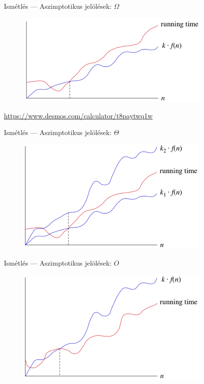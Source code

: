 \documentclass{beamer}
\begin{document}
\begin{frame}{Ismétlés --- Aszimptotikus jelölések: $\Omega$}
\begin{figure}
	\centering
	\includegraphics{Omega_fn}
\end{figure}
	\url{https://www.desmos.com/calculator/t8paytwq1w}
\end{frame}

\begin{frame}{Ismétlés --- Aszimptotikus jelölések: $\Theta$}
\begin{figure}
	\centering
	\includegraphics{Theta_fn}
\end{figure}
\end{frame}

\begin{frame}{Ismétlés --- Aszimptotikus jelölések: $O$}
\begin{figure}
	\centering
	\includegraphics{O_fn}
\end{figure}
\end{frame}
\end{document}
